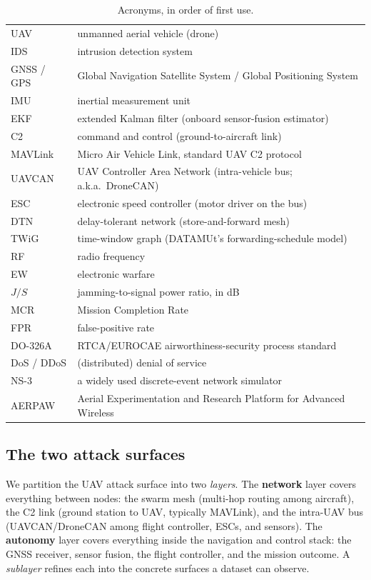 \documentclass[conference]{IEEEtran}
\newcommand{\layernet}{\textcolor{netcol}{\textbf{network}}}
\newcommand{\layerauto}{\textcolor{autocol}{\textbf{autonomy}}}
\begin{document}
\begin{table}[t]
\centering
\caption{Acronyms, in order of first use.}
\label{tab:acronyms}
\small
\renewcommand{\arraystretch}{1.1}
\begin{tabularx}{\columnwidth}{@{}lX@{}}
\toprule
UAV & unmanned aerial vehicle (drone)\\
IDS & intrusion detection system\\
GNSS / GPS & Global Navigation Satellite System / Global Positioning System\\
IMU & inertial measurement unit\\
EKF & extended Kalman filter (onboard sensor-fusion estimator)\\
C2 & command and control (ground-to-aircraft link)\\
MAVLink & Micro Air Vehicle Link, standard UAV C2 protocol\\
UAVCAN & UAV Controller Area Network (intra-vehicle bus; a.k.a.\ DroneCAN)\\
ESC & electronic speed controller (motor driver on the bus)\\
DTN & delay-tolerant network (store-and-forward mesh)\\
TWiG & time-window graph (DATAMUt's forwarding-schedule model)\\
RF & radio frequency\\
EW & electronic warfare\\
$J/S$ & jamming-to-signal power ratio, in dB\\
MCR & Mission Completion Rate\\
FPR & false-positive rate\\
DO-326A & RTCA/EUROCAE airworthiness-security process standard\\
DoS / DDoS & (distributed) denial of service\\
NS-3 & a widely used discrete-event network simulator\\
AERPAW & Aerial Experimentation and Research Platform for Advanced Wireless\\
\bottomrule
\end{tabularx}
\end{table}

\subsection{The two attack surfaces}
We partition the UAV attack surface into two \emph{layers}.
The \layernet{} layer covers everything between nodes: the swarm
mesh (multi-hop routing among aircraft), the C2 link (ground station to UAV,
typically MAVLink), and the intra-UAV bus (UAVCAN/DroneCAN among flight
controller, ESCs, and sensors). The \layerauto{} layer covers everything inside
the navigation and control stack: the GNSS receiver, sensor fusion, the flight
controller, and the mission outcome. A \emph{sublayer} refines each into the
concrete surfaces a dataset can observe.
\end{document}

